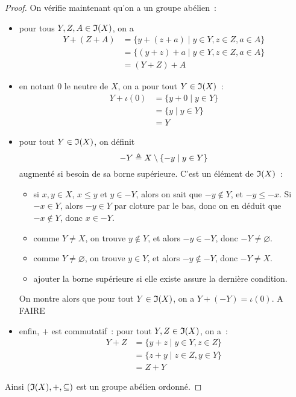 \begin{proof}
  On vérifie maintenant qu'on a un groupe abélien~:
  \begin{itemize}
  \item pour tous $Y,Z,A\in\mathfrak{I}(X)$, on a
    \begin{align*}
      Y + (Z + A) &= \{ y + (z + a) \mid y \in Y, z \in Z, a \in A\}\\
      &= \{ (y + z) + a \mid y \in Y, z \in Z, a \in A\}\\
      &= (Y + Z) + A
    \end{align*}
  \item en notant $0$ le neutre de $X$, on a pour tout $Y \in \mathfrak{I}(X)$~:
    \begin{align*}
      Y + \iota(0) &= \{ y + 0 \mid y \in Y \}\\
      &= \{y \mid y \in Y \}\\
      &= Y
    \end{align*}
  \item pour tout $Y\in \mathfrak{I}(X)$, on définit
    \[-Y \triangleq X \setminus \{ - y \mid y \in Y\}\]
    augmenté si besoin de sa borne supérieure. C'est un élément de $\mathfrak{I}(X)$~:
    \begin{itemize}
    \item si $x,y \in X$, $x\leq y$ et $y \in -Y$, alors on sait que
      $-y\notin Y$, et $-y \leq -x$. Si $-x \in Y$, alors $-y \in Y$ par cloture
      par le bas, donc on en déduit que $-x \notin Y$, donc $x \in -Y$.
    \item comme $Y \neq X$, on trouve $y\notin Y$, et alors $-y \in -Y$, donc
      $-Y\neq \varnothing$.
    \item comme $Y \neq \varnothing$, on trouve $y\in Y$, et alors
      $-y \notin -Y$, donc $-Y\neq X$.
    \item ajouter la borne supérieure si elle existe assure la dernière
      condition.
    \end{itemize}
    On montre alors que pour tout $Y \in \mathfrak{I}(X)$, on a
    $Y + (-Y) = \iota(0)$. A FAIRE
  \item enfin, $+$ est commutatif~: pour tout $Y,Z \in \mathfrak{I}(X)$, on a~:
    \begin{align*}
      Y + Z &= \{ y + z \mid y \in Y, z \in Z \}\\
      &= \{ z + y \mid z \in Z, y \in Y \}\\
      &= Z + Y
    \end{align*}
  \end{itemize}
  Ainsi $(\mathfrak{I}(X),+,\subseteq)$ est un groupe abélien ordonné.
\end{proof}

